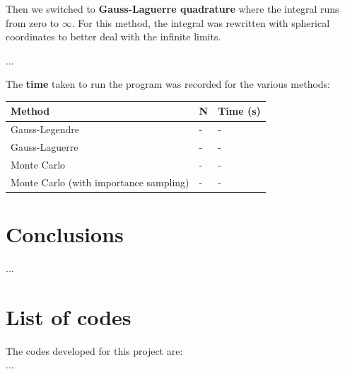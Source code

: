 \documentclass{article}
\begin{document}
\begin{multicols}{2}
Then we switched to \textbf{Gauss-Laguerre quadrature} where the integral runs from zero to $\infty$. For this method, the integral was rewritten with spherical coordinates to better deal with the infinite limits. 

...

The \textbf{time} taken to run the program was recorded for the various methods:

\begin{center}
\begin{tabular}{ l l l}\hline
	Method 								& N	 		& Time (s) \\ \hline
	Gauss-Legendre 						& - 			& - \\
	Gauss-Laguerre 						& -			& - \\
	Monte Carlo 							& - 			& - \\
	Monte Carlo (with importance sampling) 		& - 			& - \\
	\hline
\end{tabular}
\end{center}



\section{Conclusions}
...





\section{List of codes}

The codes developed for this project are:\\
...

\end{multicols}
\end{document}
